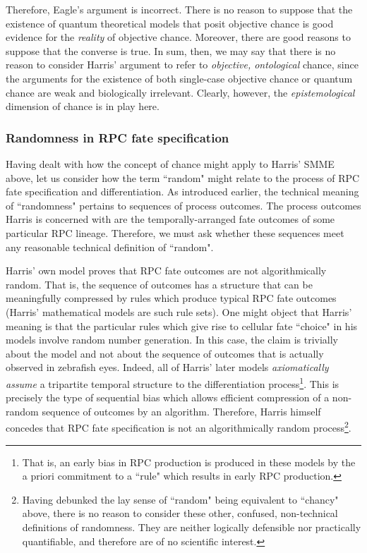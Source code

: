 Therefore, Eagle's argument is incorrect. There is no reason to suppose that the existence of quantum theoretical models that posit objective chance is good evidence for the \textit{reality} of objective chance. Moreover, there are good reasons to suppose that the converse is true. In sum, then, we may say that there is no reason to consider Harris' argument to refer to \textit{objective, ontological} chance, since the arguments for the existence of both single-case objective chance or quantum chance are weak and biologically irrelevant. Clearly, however, the \textit{epistemological} dimension of chance is in play here.

\subsubsection{Randomness in RPC fate specification}

Having dealt with how the concept of chance might apply to Harris' SMME above, let us consider how the term ``random" might relate to the process of RPC fate specification and differentiation. As introduced earlier, the technical meaning of ``randomness" pertains to sequences of process outcomes. The process outcomes Harris is concerned with are the temporally-arranged fate outcomes of some particular RPC lineage. Therefore, we must ask whether these sequences meet any reasonable technical definition of ``random".

Harris' own model proves that RPC fate outcomes are not algorithmically random. That is, the sequence of outcomes has a structure that can be meaningfully compressed by rules which produce typical RPC fate outcomes (Harris' mathematical models are such rule sets). One might object that Harris' meaning is that the particular rules which give rise to cellular fate ``choice" in his models involve random number generation. In this case, the claim is trivially about the model and not about the sequence of outcomes that is actually observed in zebrafish eyes. Indeed, all of Harris' later models \textit{axiomatically assume} a tripartite temporal structure to the differentiation process\footnote{That is, an early bias in RPC production is produced in these models by the a priori commitment to a ``rule" which results in early RPC production.}. This is precisely the type of sequential bias which allows efficient compression of a non-random sequence of outcomes by an algorithm. Therefore, Harris himself concedes that RPC fate specification is not an algorithmically random process\footnote{Having debunked the lay sense of ``random" being equivalent to ``chancy" above, there is no reason to consider these other, confused, non-technical definitions of randomness. They are neither logically defensible nor practically quantifiable, and therefore are of no scientific interest.}.


